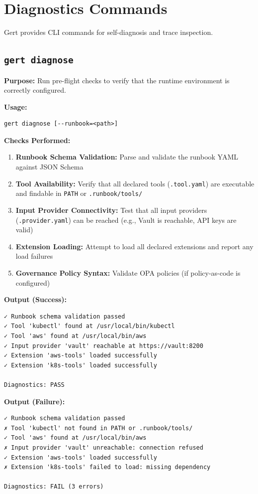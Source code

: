 \section{Diagnostics Commands}

Gert provides CLI commands for self-diagnosis and trace inspection.

\subsection{\texttt{gert diagnose}}

\textbf{Purpose:} Run pre-flight checks to verify that the runtime environment is correctly configured.

\textbf{Usage:}
\begin{verbatim}
gert diagnose [--runbook=<path>]
\end{verbatim}

\textbf{Checks Performed:}
\begin{enumerate}
  \item \textbf{Runbook Schema Validation:} Parse and validate the runbook YAML against JSON Schema
  \item \textbf{Tool Availability:} Verify that all declared tools (\texttt{.tool.yaml}) are executable and findable in \texttt{PATH} or \texttt{.runbook/tools/}
  \item \textbf{Input Provider Connectivity:} Test that all input providers (\texttt{.provider.yaml}) can be reached (e.g., Vault is reachable, API keys are valid)
  \item \textbf{Extension Loading:} Attempt to load all declared extensions and report any load failures
  \item \textbf{Governance Policy Syntax:} Validate OPA policies (if policy-as-code is configured)
\end{enumerate}

\textbf{Output (Success):}
\begin{verbatim}
✓ Runbook schema validation passed
✓ Tool 'kubectl' found at /usr/local/bin/kubectl
✓ Tool 'aws' found at /usr/local/bin/aws
✓ Input provider 'vault' reachable at https://vault:8200
✓ Extension 'aws-tools' loaded successfully
✓ Extension 'k8s-tools' loaded successfully

Diagnostics: PASS
\end{verbatim}

\textbf{Output (Failure):}
\begin{verbatim}
✓ Runbook schema validation passed
✗ Tool 'kubectl' not found in PATH or .runbook/tools/
✓ Tool 'aws' found at /usr/local/bin/aws
✗ Input provider 'vault' unreachable: connection refused
✓ Extension 'aws-tools' loaded successfully
✗ Extension 'k8s-tools' failed to load: missing dependency

Diagnostics: FAIL (3 errors)
\end{verbatim}

